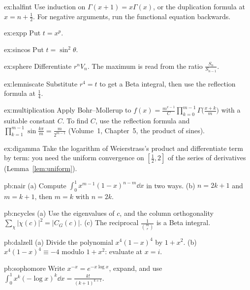 \begin{hint}{ex:halfint}
Use induction on $\Gamma(x+1)=x\Gamma(x)$, or the duplication formula at $x=n+\frac12$. For negative arguments, run the functional equation backwards.
\end{hint}
\begin{hint}{ex:expp}
Put $t=x^p$.
\end{hint}
\begin{hint}{ex:sincos}
Put $t=\sin^2\theta$.
\end{hint}
\begin{hint}{ex:sphere}
Differentiate $r^nV_n$. The maximum is read from the ratio $\frac{S_n}{S_{n-1}}$.
\end{hint}
\begin{hint}{ex:lemniscate}
Substitute $r^4=t$ to get a Beta integral, then use the reflection formula at $\frac14$.
\end{hint}
\begin{hint}{ex:multiplication}
Apply Bohr--Mollerup to $f(x)=\frac{m^{x-1}}C\prod_{k=0}^{m-1}\Gamma\bigl(\frac{x+k}m\bigr)$ with a suitable constant $C$. To find $C$, use
the reflection formula and $\prod_{k=1}^{m-1}\sin\frac{k\pi}m=\frac m{2^{m-1}}$ (Volume~1, Chapter~5, the product of sines).
\end{hint}
\begin{hint}{ex:digamma}
Take the logarithm of Weierstrass's product and differentiate term by term: you need the uniform convergence on $[\frac12,2]$
of the series of derivatives (Lemma~\ref{lem:uniform}).
\end{hint}

\begin{hint}{pb:nair}
(a) Compute $\int_0^1x^{m-1}(1-x)^{n-m}\dd x$ in two ways. (b) $n=2k+1$ and $m=k+1$, then $m=k$ with $n=2k$.
\end{hint}

\begin{hint}{pb:ncycles}
(a) Use the eigenvalues of $c$, and the column orthogonality $\sum_\chi|\chi(c)|^2=|C_G(c)|$. (c) The reciprocal $\frac1{\binom mr}$ is a Beta integral.
\end{hint}

\begin{hint}{pb:dalzell}
(a) Divide the polynomial $x^4(1-x)^4$ by $1+x^2$. (b) $x^4(1-x)^4\equiv-4$ modulo $1+x^2$: evaluate at $x=i$.
\end{hint}

\begin{hint}{pb:sophomore}
Write $x^{-x}=e^{-x\log x}$, expand, and use $\int_0^1x^k(-\log x)^k\dd x=\frac{k!}{(k+1)^{k+1}}$.
\end{hint}

